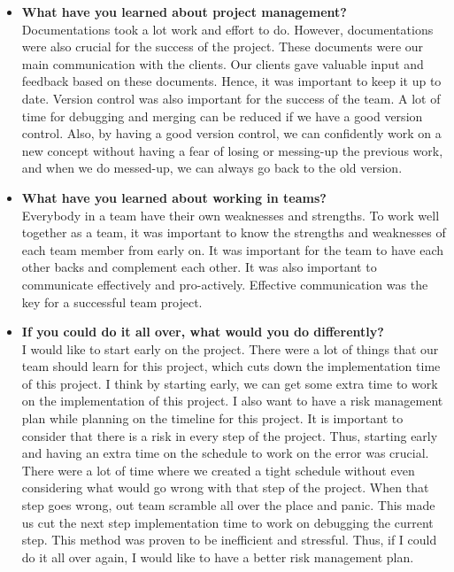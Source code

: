 \begin{itemize}
			\item \textbf{What have you learned about project management?} \\
				Documentations took a lot work and effort to do. However, documentations were also crucial for the success of the project. These documents were our main communication with the clients. Our clients gave valuable input and feedback based on these documents. Hence, it was important to keep it up to date. Version control was also important for the success of the team. A lot of time for debugging and merging can be reduced if we have a good version control. Also, by having a good version control, we can confidently work on a new concept without having a fear of losing or messing-up the previous work, and when we do messed-up, we can always go back to the old version. \\

			\item \textbf{What have you learned about working in teams?} \\
				Everybody in a team have their own weaknesses and strengths. To work well together as a team, it was important to know the strengths and weaknesses of each team member from early on. It was important for the team to have each other backs and complement each other. It was also important to communicate effectively and pro-actively. Effective communication was the key for a successful team project. \\

			\item \textbf{If you could do it all over, what would you do differently?} \\
				I would like to start early on the project. There were a lot of things that our team should learn for this project, which cuts down the implementation time of this project. I think by starting early, we can get some extra time to work on the implementation of this project. I also want to have a risk management plan while planning on the timeline for this project. It is important to consider that there is a risk in every step of the project. Thus, starting early and having an extra time on the schedule to work on the error was crucial. There were a lot of time where we created a tight schedule without even considering what would go wrong with that step of the project. When that step goes wrong, out team scramble all over the place and panic. This made us cut the next step implementation time to work on debugging the current step. This method was proven to be inefficient and stressful. Thus, if I could do it all over again, I would like to have a better risk management plan. \\
				

\end{itemize}
